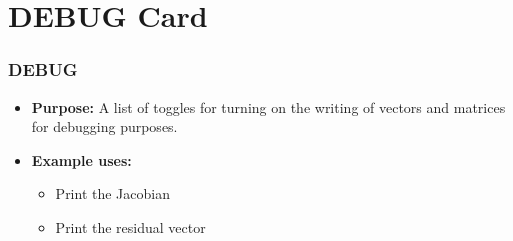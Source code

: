 \section{DEBUG Card}

\begin{frame}\frametitle{DEBUG}

\begin{itemize}{}
\item[] \textbf{Purpose:} A list of toggles for turning on the writing of vectors and matrices for debugging purposes.

\item[] \textbf{Example uses:}
\begin{itemize}
\item Print the Jacobian
\item Print the residual vector
\end{itemize}
\end{itemize}

\end{frame}


